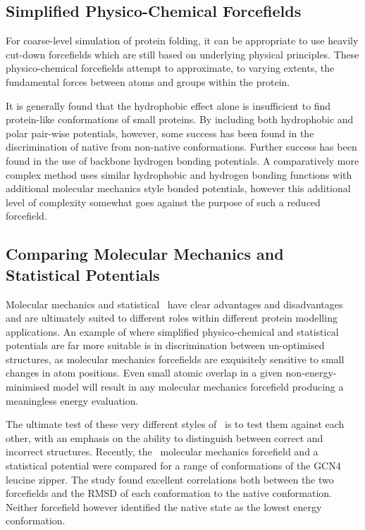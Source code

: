 \subsection{Simplified Physico-Chemical Forcefields}

For coarse-level simulation of protein folding, it can be appropriate to
use heavily cut-down forcefields which are still based on underlying physical
principles. These physico-chemical forcefields attempt to approximate, to
varying extents, the fundamental forces between atoms and groups within the
protein. 

It is generally found that the hydrophobic effect alone is insufficient to
find protein-like conformations of small proteins. By including both hydrophobic
and polar pair-wise potentials, however, some success has been found in the
discrimination of native from non-native conformations\cite{FORCEFIELD:Huang95}. Further success has been found in the use of backbone hydrogen bonding potentials\cite{FORCEFIELD:Lee1996}. A comparatively more complex method uses similar hydrophobic and hydrogen bonding
functions with additional molecular mechanics style bonded potentials\cite{FORCEFIELD:Wallqvist1994},
however this additional level of complexity somewhat goes against the purpose
of such a reduced forcefield.



\subsection{Comparing Molecular Mechanics and Statistical Potentials}

Molecular mechanics and statistical \forcefields\ have clear advantages and
disadvantages and are ultimately suited to different roles within different
protein modelling applications. An example of where simplified physico-chemical
and statistical potentials are far more suitable is in discrimination between un-optimised structures, as molecular mechanics forcefields are exquisitely
sensitive to small changes in atom positions. Even small atomic overlap in
a given non-energy-minimised model will result in any molecular mechanics forcefield producing a meaningless energy evaluation.

The ultimate test of these very different styles of \forcefield\ is to test
them against each other, with an emphasis on the ability to distinguish between correct and incorrect structures. Recently, the \charmm\ molecular mechanics forcefield and a statistical potential
were compared for a range of conformations of the GCN4 leucine zipper\cite{FORCEFIELD:Mohanty1999}.
The study found excellent correlations both between the two forcefields and the
RMSD of each conformation to the native conformation. Neither forcefield
however identified the native state as the lowest energy conformation.


